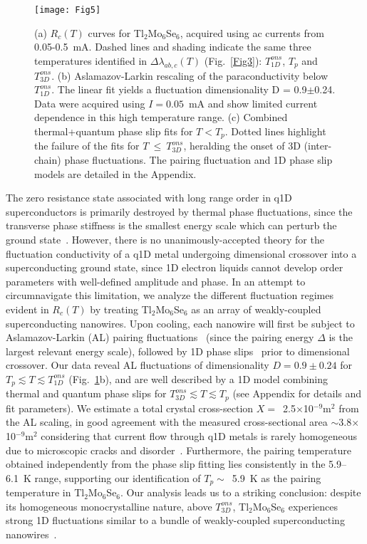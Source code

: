 \documentclass[prb,twocolumn,showpacs,preprintnumbers,amsmath,amssymb,floatfix,groupedaddress,superscriptaddress,aps,10pt]{revtex4-1}
\newcommand{\Tl}{Tl$_2$Mo$_6$Se$_6$}
\begin{document}
{\begin{figure}[tbp]
	\centering 
	\texttt{[image: Fig5]}
	\caption{\label{Fig5} (a) $R_c(T)$ curves for Tl$_2$Mo$_6$Se$_6$, acquired using ac currents from 0.05-0.5~mA.  Dashed lines and shading indicate the same three temperatures identified in $\Delta\lambda_{ab,c}(T)$ (Fig.~\ref{Fig3}): $T_{1D}^{ons}$, $T_p$ and $T_{3D}^{ons}$.  (b) Aslamazov-Larkin rescaling of the paraconductivity below $T_{1D}^{ons}$.  The linear fit yields a fluctuation dimensionality D = 0.9$\pm$0.24.  Data were acquired using $I=0.05$~mA and show limited current dependence in this high temperature range.  (c) Combined thermal+quantum phase slip fits for $T<T_p$.  Dotted lines highlight the failure of the fits for $T~\leq~T_{3D}^{ons}$, heralding the onset of 3D (inter-chain) phase fluctuations.  The pairing fluctuation and 1D phase slip models are detailed in the Appendix.}
\end{figure}

The zero resistance state associated with long range order in q1D superconductors is primarily destroyed by thermal phase fluctuations, since the transverse phase stiffness is the smallest energy scale which can perturb the ground state~\cite{Efetov1975,Schulz1983a}.  However, there is no unanimously-accepted theory for the fluctuation conductivity of a q1D metal undergoing dimensional crossover into a superconducting ground state, since 1D electron liquids cannot develop order parameters with well-defined amplitude and phase.  In an attempt to circumnavigate this limitation, we analyze the different fluctuation regimes evident in $R_c(T)$ by treating {\Tl} as an array of weakly-coupled superconducting nanowires.  Upon cooling, each nanowire will first be subject to Aslamazov-Larkin (AL) pairing fluctuations~\cite{Aslamazov1968} (since the pairing energy $\Delta$ is the largest relevant energy scale), followed by 1D phase slips~\cite{Bezryadin,Altomare,Arutyunov2008} prior to dimensional crossover.  Our data reveal AL fluctuations of dimensionality $D=0.9\pm0.24$ for $T_p\lesssim{T}\lesssim{T_{1D}^{ons}}$ (Fig.~\ref{Fig5}b), and are well described by a 1D model combining thermal and quantum phase slips for $T_{3D}^{ons}\lesssim{T}\lesssim{T_p}$ (see Appendix for details and fit parameters).  We estimate a total crystal cross-section $X=$~2.5$\times$10$^{-9}$m$^2$ from the AL scaling, in good agreement with the measured cross-sectional area $\sim$3.8$\times$10$^{-9}$m$^2$ considering that current flow through q1D metals is rarely homogeneous due to microscopic cracks and disorder~\cite{Ansermet2016}. Furthermore, the pairing temperature obtained independently from the phase slip fitting lies consistently in the 5.9--6.1~K range, supporting our identification of $T_p\sim$~5.9~K as the pairing temperature in {\Tl}.  Our analysis leads us to a striking conclusion: despite its homogeneous monocrystalline nature, above $T_{3D}^{ons}$, {\Tl} experiences strong 1D fluctuations similar to a bundle of weakly-coupled superconducting nanowires~\cite{Lortz2009,Wang2010,He2013,Wong2017}.

}
\end{document}
